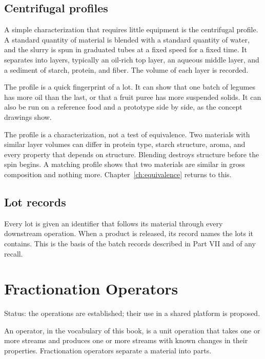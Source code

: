 \documentclass[11pt,openany]{book}
\theoremstyle{definition}
\begin{document}
\section{Centrifugal profiles}

A simple characterization that requires little equipment is the centrifugal profile. A standard quantity of material is blended with a standard quantity of water, and the slurry is spun in graduated tubes at a fixed speed for a fixed time. It separates into layers, typically an oil-rich top layer, an aqueous middle layer, and a sediment of starch, protein, and fiber. The volume of each layer is recorded.

The profile is a quick fingerprint of a lot. It can show that one batch of legumes has more oil than the last, or that a fruit puree has more suspended solids. It can also be run on a reference food and a prototype side by side, as the concept drawings show.

The profile is a characterization, not a test of equivalence. Two materials with similar layer volumes can differ in protein type, starch structure, aroma, and every property that depends on structure. Blending destroys structure before the spin begins. A matching profile shows that two materials are similar in gross composition and nothing more. Chapter~\ref{ch:equivalence} returns to this.

\section{Lot records}

Every lot is given an identifier that follows its material through every downstream operation. When a product is released, its record names the lots it contains. This is the basis of the batch records described in Part VII and of any recall.

\chapter{Fractionation Operators}\label{ch:fractionation}

Status: the operations are established; their use in a shared platform is proposed.

An operator, in the vocabulary of this book, is a unit operation that takes one or more streams and produces one or more streams with known changes in their properties. Fractionation operators separate a material into parts.
\end{document}
